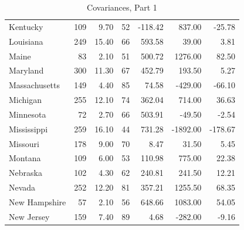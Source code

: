 \documentclass[nohyper,justified]{tufte-handout}\usepackage[]{graphicx}\usepackage[]{color}
\begin{document}
\begin{table}[ht]
\begin{tabular}{lrrrrrr}
  Kentucky & 109 & 9.70 &  52 & -118.42 & 837.00 & -25.78 \\ 
   \rowcolor[gray]{0.95}Louisiana & 249 & 15.40 &  66 & 593.58 & 39.00 & 3.81 \\ 
  Maine &  83 & 2.10 &  51 & 500.72 & 1276.00 & 82.50 \\ 
   \rowcolor[gray]{0.95}Maryland & 300 & 11.30 &  67 & 452.79 & 193.50 & 5.27 \\ 
  Massachusetts & 149 & 4.40 &  85 & 74.58 & -429.00 & -66.10 \\ 
   \rowcolor[gray]{0.95}Michigan & 255 & 12.10 &  74 & 362.04 & 714.00 & 36.63 \\ 
  Minnesota &  72 & 2.70 &  66 & 503.91 & -49.50 & -2.54 \\ 
   \rowcolor[gray]{0.95}Mississippi & 259 & 16.10 &  44 & 731.28 & -1892.00 & -178.67 \\ 
  Missouri & 178 & 9.00 &  70 & 8.47 & 31.50 & 5.45 \\ 
   \rowcolor[gray]{0.95}Montana & 109 & 6.00 &  53 & 110.98 & 775.00 & 22.38 \\ 
  Nebraska & 102 & 4.30 &  62 & 240.81 & 241.50 & 12.21 \\ 
   \rowcolor[gray]{0.95}Nevada & 252 & 12.20 &  81 & 357.21 & 1255.50 & 68.35 \\ 
  New Hampshire &  57 & 2.10 &  56 & 648.66 & 1083.00 & 54.05 \\ 
   \rowcolor[gray]{0.95}New Jersey & 159 & 7.40 &  89 & 4.68 & -282.00 & -9.16 \\ 
   \bottomrule
\end{tabular}
\caption{Covariances, Part 1} 
\end{table}
\end{document}
